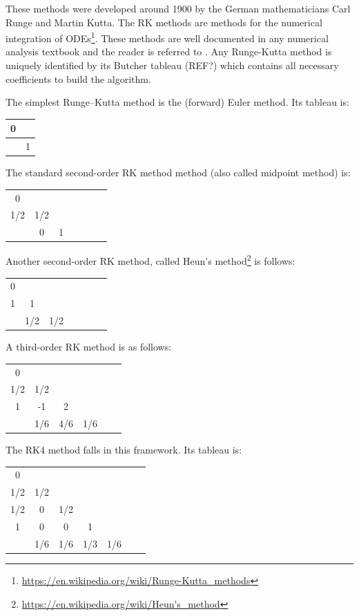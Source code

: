 These methods were developed around 1900 by the German mathematicians Carl Runge and Martin Kutta.
The RK methods are methods for the numerical integration of 
ODEs\footnote{\url{https://en.wikipedia.org/wiki/Runge-Kutta_methods}}. These methods are well 
documented in any numerical analysis textbook and the reader is referred to \cite{gery10,tack10}.
Any Runge-Kutta method is uniquely identified by its Butcher tableau (REF?) which contains 
all necessary coefficients to build the algorithm.

The simplest Runge–Kutta method is the (forward) Euler method. Its tableau is:

\begin{tabular}{c|c}
0 & \\
\hline
 & 1
\end{tabular}

 
The standard second-order RK method method (also called midpoint method) is:

\begin{tabular}{c|cccccc}
0 & \\
1/2 & 1/2 \\
\hline
 & 0 & 1 
\end{tabular}

Another second-order RK method, called Heun's 
method\footnote{\url{https://en.wikipedia.org/wiki/Heun's_method}} is follows:

\begin{tabular}{c|cccccc}
0 & \\
1 & 1 \\
\hline
 & 1/2 & 1/2 
\end{tabular}

A third-order RK method is as follows:

\begin{tabular}{c|ccccc}
0 & \\
1/2 & 1/2 \\
1 & -1 & 2 \\ 
\hline
 & 1/6 & 4/6  & 1/6
\end{tabular}


The RK4 method falls in this framework. Its tableau is:

\begin{tabular}{c|cccccc}
0 & \\
1/2 & 1/2 \\
1/2 & 0 & 1/2 \\
1 & 0 & 0 & 1 \\
\hline
 & 1/6 & 1/6 & 1/3 & 1/6 
\end{tabular}


